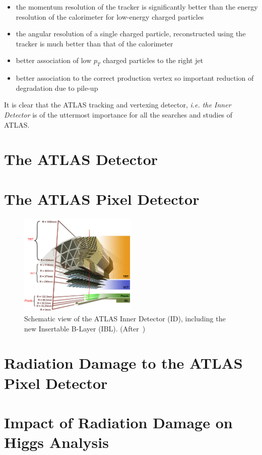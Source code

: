 \begin{itemize}
\item the momentum resolution of the tracker is significantly better than the energy resolution of the
calorimeter for low-energy charged particles
\item the angular resolution of a single charged particle, reconstructed using the tracker is much better
than that of the calorimeter
\item better association of low $p_T$ charged particles to the right jet
\item better association to the correct production vertex so important reduction of degradation due to pile-up  
\end{itemize}

It is clear that the ATLAS tracking and vertexing detector, {\it i.e. the Inner Detector} is of the uttermost importance for all
the searches and studies of ATLAS.

\section{The ATLAS Detector}
\label{sec:ATLASDetector}

\section{The ATLAS Pixel Detector}
\label{sec:ATLASPixelDetector}


\begin{figure}[!htbp]
\centering
\includegraphics[width=0.5\textwidth]{ATLAS_ID.png}
\caption{\label{fig:ATLASID}Schematic view of the  ATLAS Inner Detector (ID), including the new Insertable B-Layer (IBL). (After~\cite{Potamianos:2016ptf})}
\end{figure}


\section{Radiation Damage to the ATLAS Pixel Detector}
\label{sec:digitizer}

\section{Impact of Radiation Damage on Higgs Analysis}
\label{sec:raddamHiggs}
